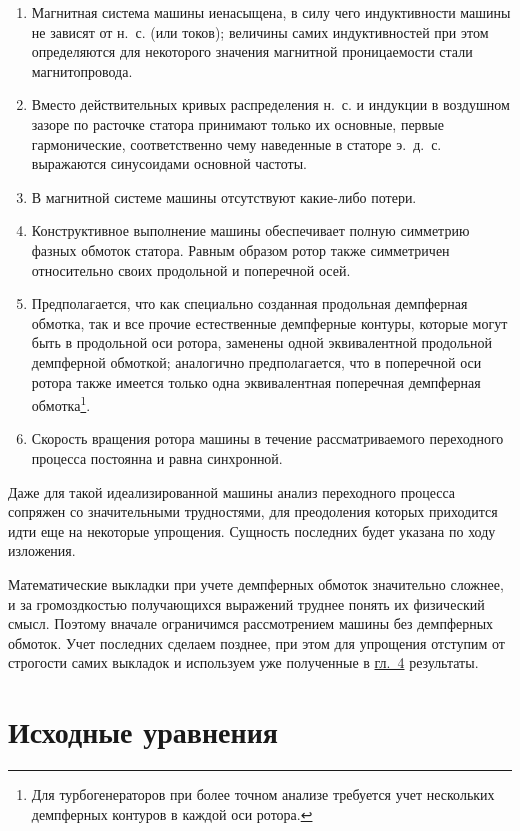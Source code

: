 \begin{enumerate} 
	\item
	Магнитная система машины иенасыщена, в силу чего индуктивности машины не зависят от н.~с. (или токов); величины самих индуктивностей при этом определяются для некоторого значения магнитной проницаемости стали магнитопровода.
	\item
	Вместо действительных кривых распределения н.~с. и индукции в воздушном зазоре по расточке статора принимают только их основные, первые гармонические, соответственно чему наведенные в статоре э.~д.~с. выражаются синусоидами основной частоты.
	\item
	В магнитной системе машины отсутствуют какие-либо потери.
	\item
	Конструктивное выполнение машины обеспечивает полную симметрию фазных обмоток статора. Равным образом ротор также симметричен относительно своих продольной и поперечной осей.
	\item
	Предполагается, что как специально созданная продольная демпферная обмотка, так и все прочие естественные демпферные контуры, которые могут быть в продольной оси ротора, заменены одной эквивалентной продольной демпферной обмоткой; аналогично предполагается, что в поперечной оси ротора также имеется только одна эквивалентная поперечная демпферная обмотка\footnote{Для турбогенераторов при более точном анализе требуется учет нескольких демпферных контуров в каждой оси ротора.}.
	\item
	Скорость вращения ротора машины в течение рассматриваемого переходного процесса постоянна и равна синхронной.
\end{enumerate}

Даже для такой идеализированной машины анализ переходного процесса сопряжен со значительными трудностями, для преодоления которых приходится идти еще на некоторые упрощения. Сущность последних будет указана по ходу изложения.

Математические выкладки при учете демпферных обмоток значительно сложнее, и за громоздкостью получающихся выражений труднее понять их физический смысл. Поэтому вначале ограничимся рассмотрением машины без демпферных обмоток. Учет последних сделаем позднее, при этом для упрощения отступим от строгости самих выкладок и используем уже полученные в \href{chap:4}{гл.~4} результаты.

\section{Исходные уравнения}
\label{sec:7-2}


